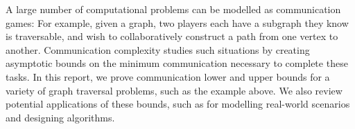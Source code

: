 A large number of computational problems can be modelled as communication games: For example, given a graph, two players each have a subgraph they know is traversable, and wish to collaboratively construct a path from one vertex to another. Communication complexity studies such situations by creating asymptotic bounds on the minimum communication necessary to complete these tasks. In this report, we prove communication lower and upper bounds for a variety of graph traversal problems, such as the example above. We also review potential applications of these bounds, such as for modelling real-world scenarios and designing algorithms.
